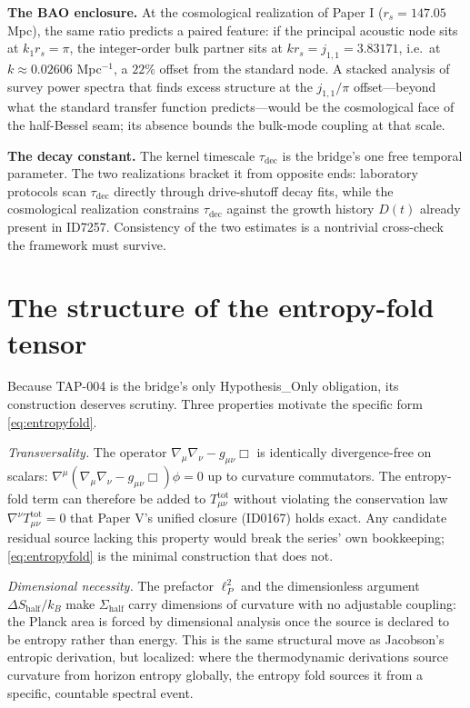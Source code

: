 \documentclass[11pt]{article}
\theoremstyle{remark}
\begin{document}
\textbf{The BAO enclosure.} At the cosmological realization of Paper I ($r_s = 147.05$ Mpc), the same ratio predicts a paired feature: if the principal acoustic node sits at $k_1 r_s = \pi$, the integer-order bulk partner sits at $k r_s = j_{1,1} = 3.83171$, i.e.\ at $k \approx 0.02606$ Mpc$^{-1}$, a $22\%$ offset from the standard node. A stacked analysis of survey power spectra that finds excess structure at the $j_{1,1}/\pi$ offset---beyond what the standard transfer function predicts---would be the cosmological face of the half-Bessel seam; its absence bounds the bulk-mode coupling at that scale.

\textbf{The decay constant.} The kernel timescale $\tau_{\mathrm{dec}}$ is the bridge's one free temporal parameter. The two realizations bracket it from opposite ends: laboratory protocols scan $\tau_{\mathrm{dec}}$ directly through drive-shutoff decay fits, while the cosmological realization constrains $\tau_{\mathrm{dec}}$ against the growth history $D(t)$ already present in ID7257. Consistency of the two estimates is a nontrivial cross-check the framework must survive.

\section{The structure of the entropy-fold tensor}
\label{sec:structure}

Because TAP-004 is the bridge's only Hypothesis\_Only obligation, its construction deserves scrutiny. Three properties motivate the specific form \eqref{eq:entropyfold}.

\emph{Transversality.} The operator $\nabla_\mu \nabla_\nu - g_{\mu\nu}\Box$ is identically divergence-free on scalars: $\nabla^\mu(\nabla_\mu \nabla_\nu - g_{\mu\nu}\Box)\phi = 0$ up to curvature commutators. The entropy-fold term can therefore be added to $T^{\mathrm{tot}}_{\mu\nu}$ without violating the conservation law $\nabla^\nu T^{\mathrm{tot}}_{\mu\nu} = 0$ that Paper V's unified closure (ID0167) holds exact. Any candidate residual source lacking this property would break the series' own bookkeeping; \eqref{eq:entropyfold} is the minimal construction that does not.

\emph{Dimensional necessity.} The prefactor $\ell_P^2$ and the dimensionless argument $\Delta S_{\mathrm{half}}/k_B$ make $\Sigma_{\mathrm{half}}$ carry dimensions of curvature with no adjustable coupling: the Planck area is forced by dimensional analysis once the source is declared to be entropy rather than energy. This is the same structural move as Jacobson's entropic derivation, but localized: where the thermodynamic derivations source curvature from horizon entropy globally, the entropy fold sources it from a specific, countable spectral event.
\end{document}

